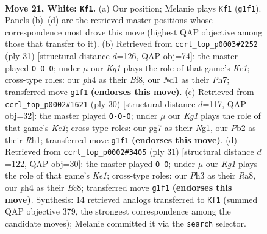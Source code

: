 \documentclass[11pt]{article}
\begin{document}
\clearpage

\begin{figure}[p]\centering
\begin{subfigure}{0.46\textwidth}\centering
\resizebox{\linewidth}{!}{%
\newchessgame
\chessboard[
  setfen={1n1qkb1r/1Q2n1p1/r1p5/p2p2P1/1p1P2Bp/7P/PPP2P2/R1BNR1K1 w - - 6 21},
  showmover=false,
  pgfstyle=straightmove, color=movearrow, markmove={g1-f1}
]}
\caption{}
\end{subfigure}\hfill
\begin{subfigure}{0.46\textwidth}\centering
\resizebox{\linewidth}{!}{%
\newchessgame
\chessboard[
  setfen={r3kb1r/1b3ppp/p4n2/N3p3/Pp2P3/8/1PqNQPPP/R1BR2K1 b kq - 0 16},
  showmover=false,
  pgfstyle=straightmove, color=movearrow, markmove={e8-c8}
]}
\caption{}
\end{subfigure}
\\[4pt]
\begin{subfigure}{0.46\textwidth}\centering
\resizebox{\linewidth}{!}{%
\newchessgame
\chessboard[
  setfen={rn1qr1k1/pp3p2/3p1n1Q/2pP1b1p/2P3pP/2N5/PP2BPP1/R3K1NR w KQ - 1 16},
  showmover=false,
  pgfstyle=straightmove, color=movearrow, markmove={e1-c1}
]}
\caption{}
\end{subfigure}\hfill
\begin{subfigure}{0.46\textwidth}\centering
\resizebox{\linewidth}{!}{%
\newchessgame
\chessboard[
  setfen={r1b1k2r/5ppp/4pb2/p1Pp4/P1qP4/R1PN4/5PPP/2BQK2R b Kkq - 2 16},
  showmover=false,
  pgfstyle=straightmove, color=movearrow, markmove={e8-g8}
]}
\caption{}
\end{subfigure}
\caption{\textbf{Move 21, White: \texttt{Kf1}.} (a) Our position; Melanie plays \texttt{Kf1} (\texttt{g1f1}). Panels (b)--(d) are the retrieved master positions whose correspondence most drove this move (highest QAP objective among those that transfer to it). (b) Retrieved from \texttt{ccrl\_top\_p0003\#2252} (ply 31) [structural distance $d$=126, QAP obj=74]: the master played \texttt{O-O-O}; under $\mu$ our \emph{Kg1} plays the role of that game's \emph{Ke1}; cross-type roles: our \emph{p}h4 as their \emph{B}f8, our \emph{N}d1 as their \emph{P}h7; transferred move \texttt{g1f1} \textbf{(endorses this move)}. (c) Retrieved from \texttt{ccrl\_top\_p0002\#1621} (ply 30) [structural distance $d$=117, QAP obj=32]: the master played \texttt{O-O-O}; under $\mu$ our \emph{Kg1} plays the role of that game's \emph{Ke1}; cross-type roles: our \emph{p}g7 as their \emph{N}g1, our \emph{P}b2 as their \emph{R}h1; transferred move \texttt{g1f1} \textbf{(endorses this move)}. (d) Retrieved from \texttt{ccrl\_top\_p0002\#3405} (ply 31) [structural distance $d$=122, QAP obj=30]: the master played \texttt{O-O}; under $\mu$ our \emph{Kg1} plays the role of that game's \emph{Ke1}; cross-type roles: our \emph{P}h3 as their \emph{R}a8, our \emph{p}h4 as their \emph{B}c8; transferred move \texttt{g1f1} \textbf{(endorses this move)}. Synthesis: 14 retrieved analogs transferred to \texttt{Kf1} (summed QAP objective 379, the strongest correspondence among the candidate moves); Melanie committed it via the \texttt{search} selector.}
\label{fig:thought-m40}
\end{figure}
\end{document}
